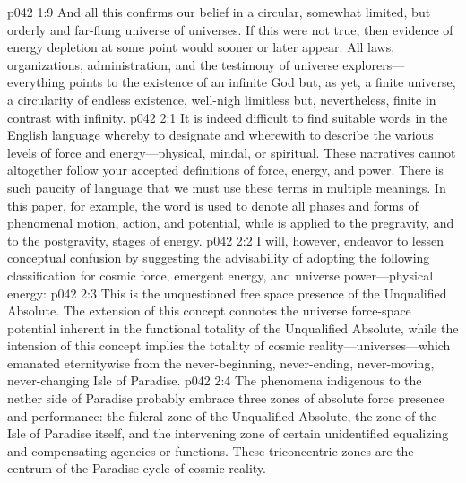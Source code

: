 \pc \vs p042 1:9 And all this confirms our belief in a circular, somewhat limited, but orderly and far\hyp{}flung universe of universes. If this were not true, then evidence of energy depletion at some point would sooner or later appear. All laws, organizations, administration, and the testimony of universe explorers---everything points to the existence of an infinite God but, as yet, a finite universe, a circularity of endless existence, well\hyp{}nigh limitless but, nevertheless, finite in contrast with infinity.
%
\vs p042 2:1 It is indeed difficult to find suitable words in the English language whereby to designate and wherewith to describe the various levels of force and energy---physical, mindal, or spiritual. These narratives cannot altogether follow your accepted definitions of force, energy, and power. There is such paucity of language that we must use these terms in multiple meanings. In this paper, for example, the word  is used to denote all phases and forms of phenomenal motion, action, and potential, while  is applied to the pregravity, and  to the postgravity, stages of energy.
\vs p042 2:2 I will, however, endeavor to lessen conceptual confusion by suggesting the advisability of adopting the following classification for cosmic force, emergent energy, and universe power---physical energy:
\pc \vs p042 2:3 \bibnobreakspace {} This is the unquestioned free space presence of the Unqualified Absolute. The extension of this concept connotes the universe force\hyp{}space potential inherent in the functional totality of the Unqualified Absolute, while the intension of this concept implies the totality of cosmic reality---universes---which emanated eternitywise from the never\hyp{}beginning, never\hyp{}ending, never\hyp{}moving, never\hyp{}changing Isle of Paradise.
\vs p042 2:4 The phenomena indigenous to the nether side of Paradise probably embrace three zones of absolute force presence and performance: the fulcral zone of the Unqualified Absolute, the zone of the Isle of Paradise itself, and the intervening zone of certain unidentified equalizing and compensating agencies or functions. These triconcentric zones are the centrum of the Paradise cycle of cosmic reality.
